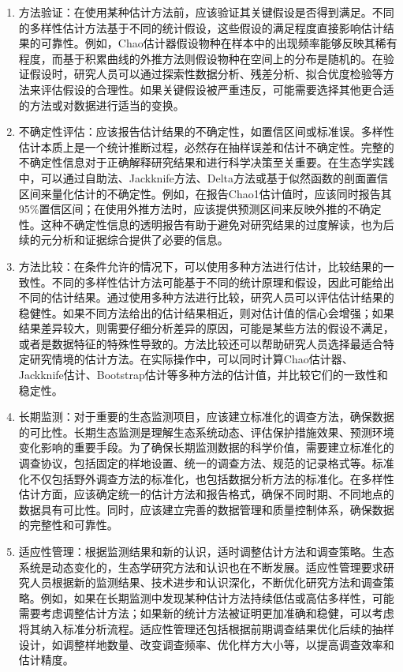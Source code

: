 \documentclass[
  twoside,12pt,fontset=none]{ctexbook}
\begin{document}
\begin{enumerate}
\def\labelenumi{\arabic{enumi}.}
\item
  方法验证：在使用某种估计方法前，应该验证其关键假设是否得到满足。不同的多样性估计方法基于不同的统计假设，这些假设的满足程度直接影响估计结果的可靠性。例如，Chao估计器假设物种在样本中的出现频率能够反映其稀有程度，而基于积累曲线的外推方法则假设物种在空间上的分布是随机的。在验证假设时，研究人员可以通过探索性数据分析、残差分析、拟合优度检验等方法来评估假设的合理性。如果关键假设被严重违反，可能需要选择其他更合适的方法或对数据进行适当的变换。
\item
  不确定性评估：应该报告估计结果的不确定性，如置信区间或标准误。多样性估计本质上是一个统计推断过程，必然存在抽样误差和估计不确定性。完整的不确定性信息对于正确解释研究结果和进行科学决策至关重要。在生态学实践中，可以通过自助法、Jackknife方法、Delta方法或基于似然函数的剖面置信区间来量化估计的不确定性。例如，在报告Chao1估计值时，应该同时报告其95\%置信区间；在使用外推方法时，应该提供预测区间来反映外推的不确定性。这种不确定性信息的透明报告有助于避免对研究结果的过度解读，也为后续的元分析和证据综合提供了必要的信息。
\item
  方法比较：在条件允许的情况下，可以使用多种方法进行估计，比较结果的一致性。不同的多样性估计方法可能基于不同的统计原理和假设，因此可能给出不同的估计结果。通过使用多种方法进行比较，研究人员可以评估估计结果的稳健性。如果不同方法给出的估计结果相近，则对估计值的信心会增强；如果结果差异较大，则需要仔细分析差异的原因，可能是某些方法的假设不满足，或者是数据特征的特殊性导致的。方法比较还可以帮助研究人员选择最适合特定研究情境的估计方法。在实际操作中，可以同时计算Chao估计器、Jackknife估计、Bootstrap估计等多种方法的估计值，并比较它们的一致性和稳定性。
\item
  长期监测：对于重要的生态监测项目，应该建立标准化的调查方法，确保数据的可比性。长期生态监测是理解生态系统动态、评估保护措施效果、预测环境变化影响的重要手段。为了确保长期监测数据的科学价值，需要建立标准化的调查协议，包括固定的样地设置、统一的调查方法、规范的记录格式等。标准化不仅包括野外调查方法的标准化，也包括数据分析方法的标准化。在多样性估计方面，应该确定统一的估计方法和报告格式，确保不同时期、不同地点的数据具有可比性。同时，应该建立完善的数据管理和质量控制体系，确保数据的完整性和可靠性。
\item
  适应性管理：根据监测结果和新的认识，适时调整估计方法和调查策略。生态系统是动态变化的，生态学研究方法和认识也在不断发展。适应性管理要求研究人员根据新的监测结果、技术进步和认识深化，不断优化研究方法和调查策略。例如，如果在长期监测中发现某种估计方法持续低估或高估多样性，可能需要考虑调整估计方法；如果新的统计方法被证明更加准确和稳健，可以考虑将其纳入标准分析流程。适应性管理还包括根据前期调查结果优化后续的抽样设计，如调整样地数量、改变调查频率、优化样方大小等，以提高调查效率和估计精度。
\end{enumerate}
\end{document}
